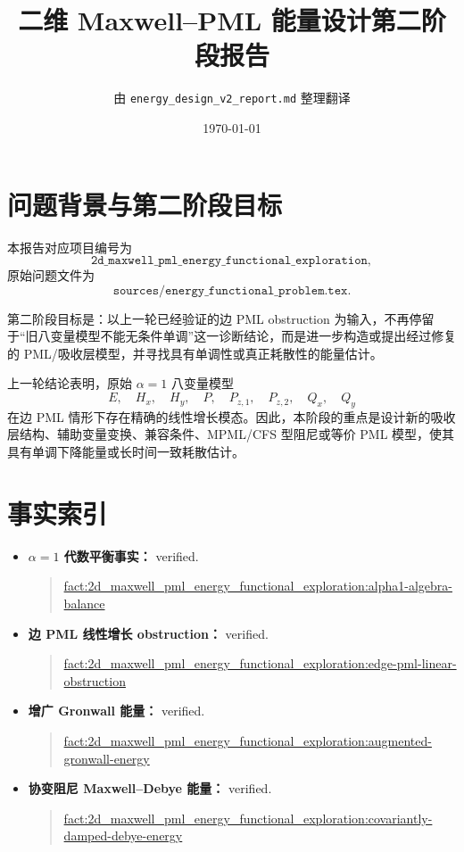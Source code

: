 \documentclass[UTF8,a4paper,12pt]{ctexart}
\title{二维 Maxwell--PML 能量设计第二阶段报告}
\author{由 \texttt{energy\_design\_v2\_report.md} 整理翻译}
\date{\today}
\begin{document}
\maketitle

\section{问题背景与第二阶段目标}

本报告对应项目编号为
\[
\texttt{2d\_maxwell\_pml\_energy\_functional\_exploration},
\]
原始问题文件为
\[
\texttt{sources/energy\_functional\_problem.tex}.
\]

第二阶段目标是：以上一轮已经验证的边 PML obstruction 为输入，不再停留于“旧八变量模型不能无条件单调”这一诊断结论，而是进一步构造或提出经过修复的 PML/吸收层模型，并寻找具有单调性或真正耗散性的能量估计。

上一轮结论表明，原始 \(\alpha=1\) 八变量模型
\[
E,\quad H_x,\quad H_y,\quad P,\quad P_{z,1},\quad P_{z,2},\quad Q_x,\quad Q_y
\]
在边 PML 情形下存在精确的线性增长模态。因此，本阶段的重点是设计新的吸收层结构、辅助变量变换、兼容条件、MPML/CFS 型阻尼或等价 PML 模型，使其具有单调下降能量或长时间一致耗散估计。

\section{事实索引}

\begin{itemize}
\item \textbf{\(\alpha=1\) 代数平衡事实：} verified.

\begin{quote}\small
\url{fact:2d_maxwell_pml_energy_functional_exploration:alpha1-algebra-balance}
\end{quote}

\item \textbf{边 PML 线性增长 obstruction：} verified.

\begin{quote}\small
\url{fact:2d_maxwell_pml_energy_functional_exploration:edge-pml-linear-obstruction}
\end{quote}

\item \textbf{增广 Gronwall 能量：} verified.

\begin{quote}\small
\url{fact:2d_maxwell_pml_energy_functional_exploration:augmented-gronwall-energy}
\end{quote}

\item \textbf{协变阻尼 Maxwell--Debye 能量：} verified.

\begin{quote}\small
\url{fact:2d_maxwell_pml_energy_functional_exploration:covariantly-damped-debye-energy}
\end{quote}
\end{itemize}
\end{document}

